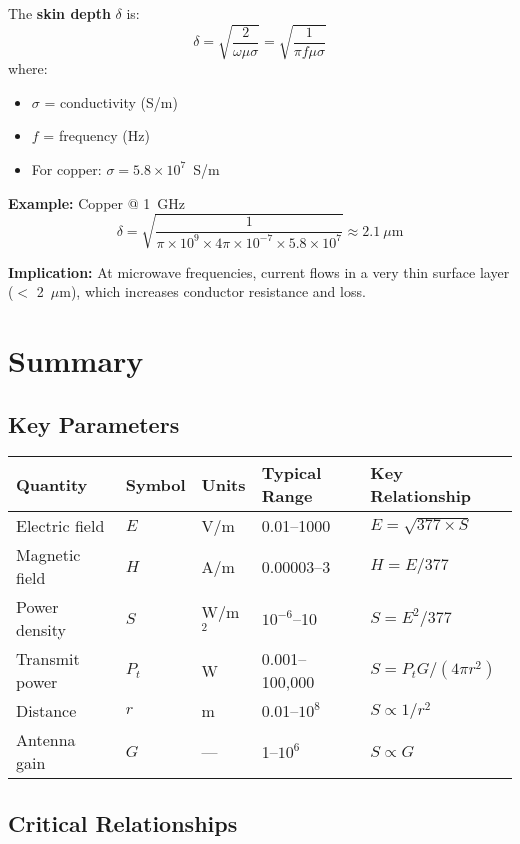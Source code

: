 The \textbf{skin depth} $\delta$ is:
\begin{equation}
\delta = \sqrt{\frac{2}{\omega \mu \sigma}} = \sqrt{\frac{1}{\pi f \mu \sigma}}
\label{eq:skin-depth}
\end{equation}
where:
\begin{itemize}
\item $\sigma$ = conductivity (S/m)
\item $f$ = frequency (Hz)
\item For copper: $\sigma = 5.8 \times 10^7$~S/m
\end{itemize}

\textbf{Example:} Copper @ 1~GHz
\[
\delta = \sqrt{\frac{1}{\pi \times 10^9 \times 4\pi \times 10^{-7} \times 5.8 \times 10^7}} \approx 2.1~\mu\text{m}
\]

\textbf{Implication:} At microwave frequencies, current flows in a very thin surface layer ($<$ 2~$\mu$m), which increases conductor resistance and loss.

\section{Summary}

\subsection{Key Parameters}

\begin{center}
\begin{tabular}{@{}lllll@{}}
\toprule
Quantity & Symbol & Units & Typical Range & Key Relationship \\
\midrule
Electric field & $E$ & V/m & 0.01--1000 & $E = \sqrt{377 \times S}$ \\
Magnetic field & $H$ & A/m & 0.00003--3 & $H = E/377$ \\
Power density & $S$ & W/m$^2$ & $10^{-6}$--10 & $S = E^2/377$ \\
Transmit power & $P_t$ & W & 0.001--100,000 & $S = P_t G / (4\pi r^2)$ \\
Distance & $r$ & m & 0.01--$10^8$ & $S \propto 1/r^2$ \\
Antenna gain & $G$ & --- & 1--$10^6$ & $S \propto G$ \\
\bottomrule
\end{tabular}
\end{center}

\subsection{Critical Relationships}

